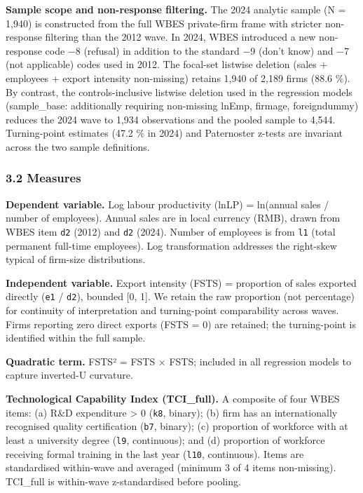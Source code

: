 \documentclass[
  12pt,a4paper]{article}
\begin{document}
\textbf{Sample scope and non-response filtering.} The 2024 analytic
sample (N = 1,940) is constructed from the full WBES private-firm frame
with stricter non-response filtering than the 2012 wave. In 2024, WBES
introduced a new non-response code −8 (refusal) in addition to the
standard −9 (don't know) and −7 (not applicable) codes used in 2012. The
focal-set listwise deletion (sales + employees + export intensity
non-missing) retains 1,940 of 2,189 firms (88.6 \%). By contrast, the
controls-inclusive listwise deletion used in the regression models
(sample\_base: additionally requiring non-missing lnEmp, firmage,
foreigndummy) reduces the 2024 wave to 1,934 observations and the pooled
sample to 4,544. Turning-point estimates (47.2 \% in 2024) and
Paternoster z-tests are invariant across the two sample definitions.

\hypertarget{measures}{%
\subsubsection{3.2 Measures}\label{measures}}

\textbf{Dependent variable.} Log labour productivity (lnLP) = ln(annual
sales / number of employees). Annual sales are in local currency (RMB),
drawn from WBES item \texttt{d2} (2012) and \texttt{d2} (2024). Number
of employees is from \texttt{l1} (total permanent full-time employees).
Log transformation addresses the right-skew typical of firm-size
distributions.

\textbf{Independent variable.} Export intensity (FSTS) = proportion of
sales exported directly (\texttt{e1} / \texttt{d2}), bounded {[}0, 1{]}.
We retain the raw proportion (not percentage) for continuity of
interpretation and turning-point comparability across waves. Firms
reporting zero direct exports (FSTS = 0) are retained; the turning-point
is identified within the full sample.

\textbf{Quadratic term.} FSTS² = FSTS × FSTS; included in all regression
models to capture inverted-U curvature.

\textbf{Technological Capability Index (TCI\_full).} A composite of four
WBES items: (a) R\&D expenditure \textgreater{} 0 (\texttt{k8}, binary);
(b) firm has an internationally recognised quality certification
(\texttt{b7}, binary); (c) proportion of workforce with at least a
university degree (\texttt{l9}, continuous); and (d) proportion of
workforce receiving formal training in the last year (\texttt{l10},
continuous). Items are standardised within-wave and averaged (minimum 3
of 4 items non-missing). TCI\_full is within-wave z-standardised before
pooling.
\end{document}
